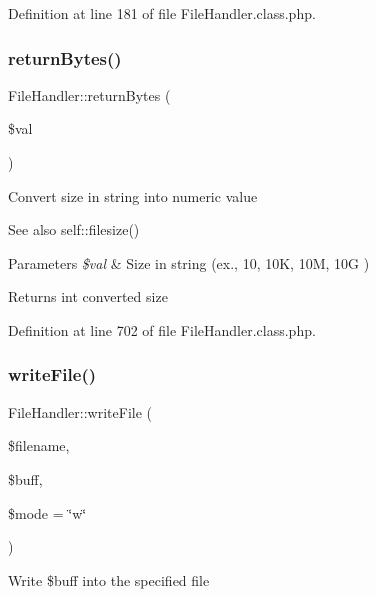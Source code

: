Definition at line 181 of file File\+Handler.\+class.\+php.

\hypertarget{classFileHandler_a79dd068137470965b560f4d23d978e7d}{}\label{classFileHandler_a79dd068137470965b560f4d23d978e7d} 
\subsubsection{\texorpdfstring{return\+Bytes()}{returnBytes()}}
{\footnotesize\ttfamily File\+Handler\+::return\+Bytes (\begin{DoxyParamCaption}\item[{}]{\$val }\end{DoxyParamCaption})}

Convert size in string into numeric value

\begin{DoxySeeAlso}{See also}
self\+::filesize() 
\end{DoxySeeAlso}

\begin{DoxyParams}{Parameters}
{\em \$val} & Size in string (ex., 10, 10K, 10M, 10G ) \\
\hline
\end{DoxyParams}
\begin{DoxyReturn}{Returns}
int converted size 
\end{DoxyReturn}


Definition at line 702 of file File\+Handler.\+class.\+php.

\hypertarget{classFileHandler_ad90c10a81460f437bc68952427606155}{}\label{classFileHandler_ad90c10a81460f437bc68952427606155} 
\subsubsection{\texorpdfstring{write\+File()}{writeFile()}}
{\footnotesize\ttfamily File\+Handler\+::write\+File (\begin{DoxyParamCaption}\item[{}]{\$filename,  }\item[{}]{\$buff,  }\item[{}]{\$mode = {\ttfamily \char`\"{}w\char`\"{}} }\end{DoxyParamCaption})}

Write \$buff into the specified file


